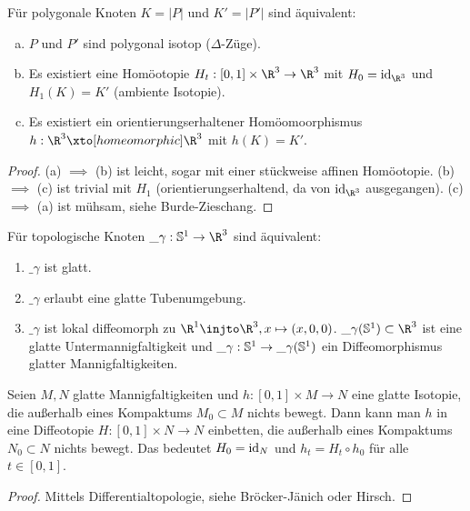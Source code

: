 \begin{st}
    Für polygonale Knoten $K = |P|$ und $K' = |P'|$ sind äquivalent:
    \begin{enumerate}[(a)]
        \item
            $P$ und $P'$ sind polygonal isotop ($\Delta$-Züge).
        \item
            Es existiert eine Homöotopie $H_t: [0,1] \times \R^3 \to \R^3$ mit $H_0 = \id_{\R^3}$ und $H_1(K) = K'$ (ambiente Isotopie).
        \item
            Es existiert ein orientierungserhaltener Homöomoorphismus $h: \R^3 \homto \R^3$ mit $h(K) = K'$.
    \end{enumerate}
    \begin{proof}
        (a) $\implies$ (b) ist leicht, sogar mit einer stückweise affinen Homöotopie.
        (b) $\implies$ (c) ist trivial mit $H_1$ (orientierungserhaltend, da von $\id_{\R^3}$ ausgegangen).
        (c) $\implies$ (a) ist mühsam, siehe Burde-Zieschang. %
    \end{proof}
\end{st}

\begin{st}
    Für topologische Knoten $\_\gamma: \S^1 \to \R^3$ sind äquivalent:
    \begin{enumerate}[(1)]
        \item
            $\_\gamma$ ist glatt.
        \item
            $\_\gamma$ erlaubt eine glatte Tubenumgebung.
        \item
            $\_\gamma$ ist lokal diffeomorph zu $\R^1 \injto \R^3, x \mapsto (x,0,0)$.
            $\_\gamma(\S^1) \subset \R^3$ ist eine glatte Untermannigfaltigkeit und $\_\gamma: \S^1 \to \_\gamma(\S^1)$ ein Diffeomorphismus glatter Mannigfaltigkeiten.
    \end{enumerate}
\end{st}

\begin{st}
    Seien $M, N$ glatte Mannigfaltigkeiten und $h: [0,1] \times M \to N$ eine glatte Isotopie, die außerhalb eines Kompaktums $M_0 \subset M$ nichts bewegt.
    Dann kann man $h$ in eine Diffeotopie $H: [0,1] \times N \to N$ einbetten, die außerhalb eines Kompaktums $N_0 \subset N$ nichts bewegt.
    Das bedeutet $H_0 = \id_N$ und $h_t = H_t \circ h_0$ für alle $t \in [0,1]$.
    \begin{proof}
        Mittels Differentialtopologie, siehe Bröcker-Jänich oder Hirsch. %
    \end{proof}
\end{st}

